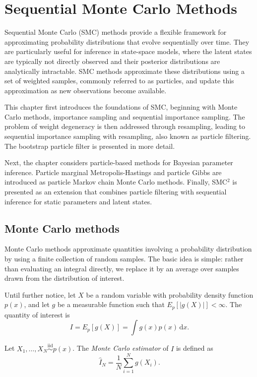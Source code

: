 \chapter{Sequential Monte Carlo Methods}
\label{chap:sequential_monte_carlo}

Sequential Monte Carlo (SMC) methods provide a flexible framework for approximating probability distributions that evolve sequentially over time. 
They are particularly useful for inference in state-space models, where the latent states are typically not directly observed and their posterior distributions are analytically intractable. 
SMC methods approximate these distributions using a set of weighted samples, commonly referred to as particles, and update this approximation as new observations become available.

This chapter first introduces the foundations of SMC, beginning with Monte Carlo methods, importance sampling and sequential importance sampling. 
The problem of weight degeneracy is then addressed through resampling, leading to sequential importance sampling with resampling, also known as particle filtering. 
The bootstrap particle filter is presented in more detail.

Next, the chapter considers particle-based methods for Bayesian parameter inference. 
Particle marginal Metropolis-Hastings and particle Gibbs are introduced as particle Markov chain Monte Carlo methods. 
Finally, SMC$^2$ is presented as an extension that combines particle filtering with sequential inference for static parameters and latent states.

\section{Monte Carlo methods}
Monte Carlo methods approximate quantities involving a probability distribution by using a finite collection of random samples. The basic idea is simple: rather than evaluating an integral directly, we replace it by an average over samples drawn from the distribution of interest.

Until further notice, let $X$ be a random variable with probability density function $p(x)$, and let $g$ be a measurable function such that $E_p[|g(X)|] < \infty$. The quantity of interest is
\begin{equation}
    I = E_p[g(X)] = \int g(x)p(x)\,\mathrm{d}x.
    \label{eq:target_expectation}
\end{equation}

\begin{definition}
    Let $X_1,\ldots,X_N \overset{\mathrm{iid}}{\sim} p(x)$. The \emph{Monte Carlo estimator} of $I$ is defined as
    \begin{equation}
        \hat{I}_N = \frac{1}{N}\sum_{i=1}^{N} g(X_i).
        \label{eq:monte_carlo_estimator}
    \end{equation}
\end{definition}


